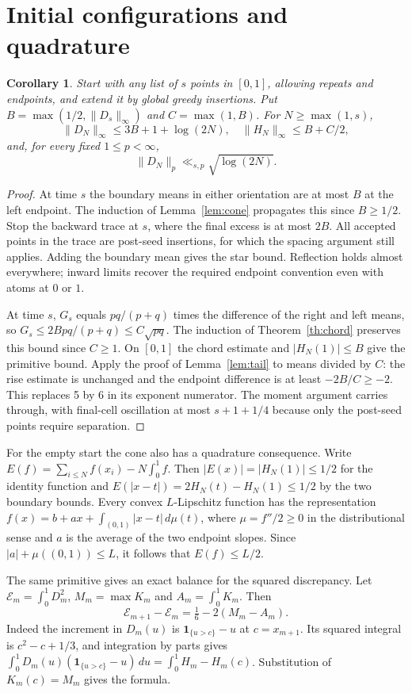 \documentclass[11pt,a4paper]{amsart}
\newtheorem{corollary}[theorem]{Corollary}
\newcommand{\norm}[1]{\lVert #1\rVert}
\newcommand{\ind}{\mathbf{1}}
\begin{document}
\section{Initial configurations and quadrature}
\begin{corollary}
Start with any list of $s$ points in $[0,1]$, allowing repeats and
endpoints, and extend it by global greedy insertions. Put
$B=\max(1/2,\norm{D_s}_\infty)$ and $C=\max(1,B)$. For $N\ge\max(1,s)$,
\[
 \norm{D_N}_\infty\le3B+1+\log(2N),\quad
 \norm{H_N}_\infty\le B+C/2,
\]
and, for every fixed $1\le p<\infty$,
\[
 \norm{D_N}_p\ll_{s,p}\sqrt{\log(2N)}.
\]
\end{corollary}
\begin{proof}
At time $s$ the boundary means in either orientation are at most $B$
at the left endpoint. The induction of Lemma~\ref{lem:cone} propagates
this since $B\ge1/2$. Stop the backward trace at $s$, where the final
excess is at most $2B$. All accepted points in the trace are post-seed
insertions, for which the spacing argument still applies. Adding the
boundary mean gives the star bound. Reflection holds almost everywhere;
inward limits recover the required endpoint convention even with atoms
at $0$ or $1$.

At time $s$, $G_s$ equals $pq/(p+q)$ times the difference of the right
and left means, so $G_s\le 2Bpq/(p+q)\le C\sqrt{pq}$. The induction
of Theorem~\ref{th:chord} preserves this bound since $C\ge1$.
On $[0,1]$ the chord estimate and $|H_N(1)|\le B$ give the primitive
bound. Apply the proof of Lemma~\ref{lem:tail} to means divided by $C$:
the rise estimate is unchanged and the endpoint difference is at least
$-2B/C\ge-2$. This replaces 5 by 6 in its exponent numerator.
The moment argument carries through, with final-cell oscillation at most
$s+1+1/4$ because only the post-seed points require separation.
\end{proof}

For the empty start the cone also has a quadrature consequence. Write
$E(f)=\sum_{i\le N} f(x_i)-N\int_0^1 f$. Then $|E(x)|=|H_N(1)|\le1/2$
for the identity function and
$E(|x-t|)=2H_N(t)-H_N(1)\le1/2$ by the two boundary bounds.
Every convex $L$-Lipschitz function has the representation
$f(x)=b+ax+\int_{(0,1)}|x-t|\,d\mu(t)$, where $\mu=f''/2\ge0$
in the distributional sense and $a$ is the average of the two endpoint
slopes. Since $|a|+\mu((0,1))\le L$, it follows that $E(f)\le L/2$.

The same primitive gives an exact balance for the squared discrepancy.
Let $\mathcal E_m=\int_0^1D_m^2$, $M_m=\max K_m$ and
$A_m=\int_0^1K_m$. Then
\[
 \mathcal E_{m+1}-\mathcal E_m=\tfrac16-2(M_m-A_m).
\]
Indeed the increment in $D_m(u)$ is $\ind_{\{u>c\}}-u$ at
$c=x_{m+1}$. Its squared integral is $c^2-c+1/3$, and integration by
parts gives $\int_0^1D_m(u)(\ind_{\{u>c\}}-u)\,du=\int_0^1 H_m-H_m(c)$.
Substitution of $K_m(c)=M_m$ gives the formula.
\end{document}
